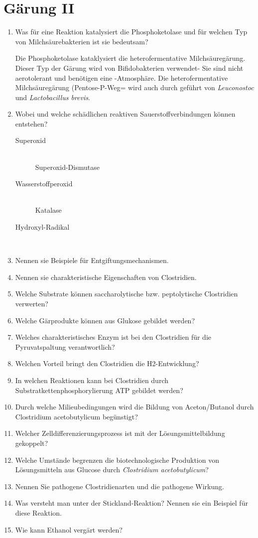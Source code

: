 
\section{Gärung II}
\begin{enumerate}
	\item Was für eine Reaktion katalysiert die Phosphoketolase und für welchen Typ von Milchsäurebakterien ist sie bedeutsam?

		Die Phosphoketolase kataklysiert die heterofermentative Milchsäuregärung.
		Dieser Typ der Gärung wird von Bifidobakterien verwendet-
		Sie sind nicht aerotolerant und benötigen eine -Atmosphäre.
		Die heterofermentative Milchsäuregärung (Pentose-P-Weg= wird auch durch geführt von \emph{Leuconostoc} und
		\emph{Lactobacillus brevis}.
		
	\item Wobei und welche schädlichen reaktiven Sauerstoffverbindungen können entstehen?
		\begin{description}
			\item[Superoxid ] \hfill\\
				Superoxid-Dismutase
			\item[Wasserstoffperoxid ] \hfill\\
				Katalase
			\item[Hydroxyl-Radikal ] \hfill\\
		\end{description}

	\item Nennen sie Beispiele für Entgiftungsmechanismen.
	\item Nennen sie charakteristische Eigenschaften von Clostridien.
	\item Welche Substrate können saccharolytische bzw. peptolytische Clostridien verwerten?
	\item Welche Gärprodukte können aus Glukose gebildet werden?
	\item Welches charakteristisches Enzym ist bei den Clostridien für die Pyruvatspaltung verantwortlich?
	\item Welchen Vorteil bringt den Clostridien die H2-Entwicklung?
	\item In welchen Reaktionen kann bei Clostridien durch Substratkettenphosphorylierung ATP gebildet werden?
	\item Durch welche Milieubedingungen wird die Bildung von Aceton/Butanol durch Clostridium acetobutylicum begünstigt?
	\item Welcher Zelldifferenzierungsprozess ist mit der Lösungsmittelbildung gekoppelt?
	\item Welche Umstände begrenzen die biotechnologische Produktion von Lösungsmitteln aus Glucose durch \emph{Clostridium acetobutylicum}?
	\item Nennen Sie pathogene Clostridienarten und die pathogene Wirkung.
	\item Was versteht man unter der Stickland-Reaktion? Nennen sie ein Beispiel für diese Reaktion.
	\item Wie kann Ethanol vergärt werden?
\end{enumerate}
